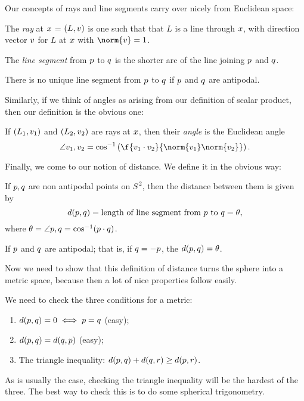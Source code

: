 Our concepts of rays and line segments carry over nicely from Euclidean space:

\begin{definition}
	The \emph{ray} at $x$ = $(L,v)$ is one such that that $L$ is a line through $x$, with direction vector $v$ for $L$ at $x$ with $\norm{\vv}=1$.
	
	
	The \emph{line segment} from $p$ to $q$ is the shorter arc of the line joining $p$ and $q$.

	
	There is no unique line segment from $p$ to $q$ if $p$ and $q$ are antipodal.
\end{definition}

Similarly, if we think of angles as arising from our definition of scalar product, then our definition is the obvious one:

\begin{definition}
	If $(L_1,v_1)$ and $(L_2,v_2)$ are rays at $x$, then their \emph{angle} is the Euclidean angle
	\begin{equation*}
		\angle \vv_1,\vv_2 = \cos^{-1}\left( \f{\vv_1 \cdot \vv_2}{\norm{\vv_1} \norm{\vv_2}} \right).
	\end{equation*}
\end{definition}

Finally, we come to our notion of distance. We define it in the obvious way:

\begin{definition}
	If $p,q$ are non antipodal points on $S^{\,2}$, then the distance between them is given by
	\begin{equation*}
		d(p,q) = \text{length of line segment from $p$ to $q$} = \theta,
	\end{equation*}
	where $\theta=\angle p,q = \cos^{-1}(p\cdot q)$.

	If $p$ and $q$ are antipodal; that is, if $q=-p$, the $d(p,q) = \theta$.
\end{definition}

Now we need to show that this definition of distance turns the sphere into a metric space, because then a lot of nice properties follow easily.

We need to check the three conditions for a metric:
\begin{enumerate}
	\shortskip
	\item $d(p,q) = 0 \iff p=q$ (easy);
	\item $d(p,q) = d(q,p)$ (easy);
	\item The triangle inequality: $d(p,q) + d(q,r) \geq d(p,r)$.
\end{enumerate}
As is usually the case, checking the triangle inequality will be the hardest of the three. The best way to check this is to do some spherical trigonometry.

